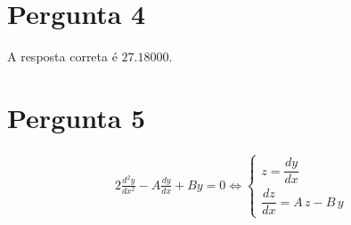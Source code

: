 {\section{Pergunta 4}

A resposta correta é $27.18000$.

\section{Pergunta 5}
\begin{alignat*}{2}
	\frac{d^2y}{dx^2}-A\frac{dy}{dx}+By=0 \iff
	\begin{cases}
		z = \dfrac{dy}{dx}\\
		\dfrac{dz}{dx}=A\,z-B\,y
	\end{cases}
\end{alignat*}

}